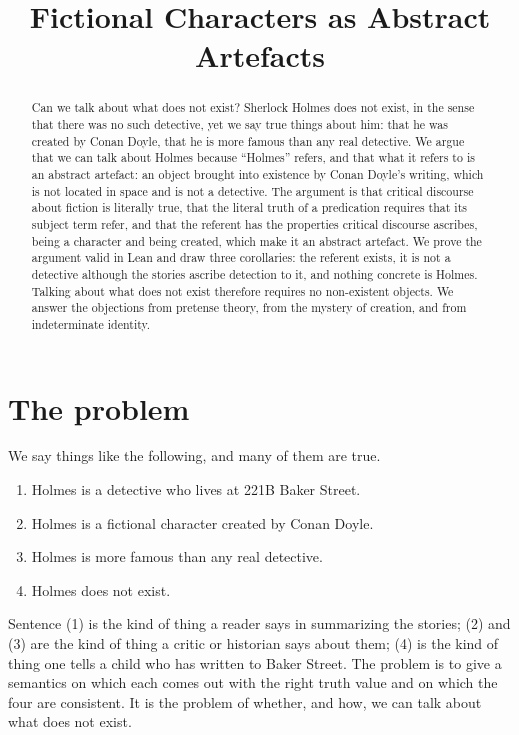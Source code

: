 \documentclass{situationist-preprint}
\title{Fictional Characters as Abstract Artefacts}
\begin{document}
\maketitle

\begin{abstract}
Can we talk about what does not exist? Sherlock Holmes does not exist, in the sense that there was no such detective, yet we say true things about him: that he was created by Conan Doyle, that he is more famous than any real detective. We argue that we can talk about Holmes because \enquote{Holmes} refers, and that what it refers to is an abstract artefact: an object brought into existence by Conan Doyle's writing, which is not located in space and is not a detective. The argument is that critical discourse about fiction is literally true, that the literal truth of a predication requires that its subject term refer, and that the referent has the properties critical discourse ascribes, being a character and being created, which make it an abstract artefact. We prove the argument valid in Lean and draw three corollaries: the referent exists, it is not a detective although the stories ascribe detection to it, and nothing concrete is Holmes. Talking about what does not exist therefore requires no non-existent objects. We answer the objections from pretense theory, from the mystery of creation, and from indeterminate identity.
\end{abstract}

\section{The problem}

We say things like the following, and many of them are true.
\begin{enumerate}[label=(\arabic*)]
\item Holmes is a detective who lives at 221B Baker Street.
\item Holmes is a fictional character created by Conan Doyle.
\item Holmes is more famous than any real detective.
\item Holmes does not exist.
\end{enumerate}
Sentence (1) is the kind of thing a reader says in summarizing the stories; (2) and (3) are the kind of thing a critic or historian says about them; (4) is the kind of thing one tells a child who has written to Baker Street. The problem is to give a semantics on which each comes out with the right truth value and on which the four are consistent. It is the problem of whether, and how, we can talk about what does not exist.
\end{document}
